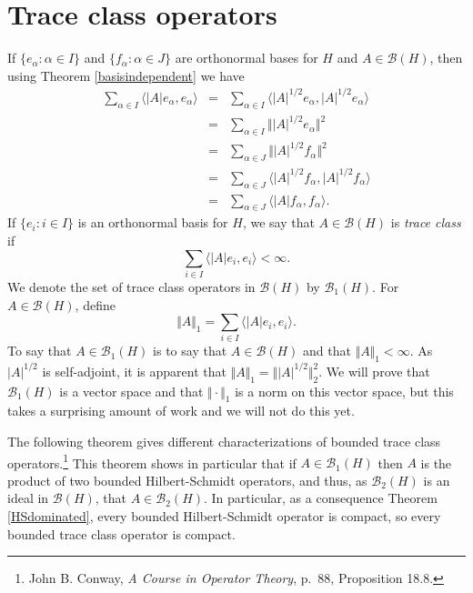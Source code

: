 \documentclass{article}
\newcommand{\inner}[2]{\langle #1, #2 \rangle}
\newcommand{\norm}[1]{\Vert #1 \Vert}
\begin{document}
\section{Trace class operators}
 If $\{e_\alpha: \alpha \in I\}$ and $\{f_\alpha: \alpha \in J\}$ are orthonormal bases for $H$
and $A \in \mathscr{B}(H)$, then using Theorem \ref{basisindependent} we have
\begin{eqnarray*}
\sum_{\alpha \in I} \inner{|A|e_\alpha}{e_\alpha}&=&\sum_{\alpha \in I} \inner{|A|^{1/2}e_\alpha}{|A|^{1/2}e_\alpha}\\
&=&\sum_{\alpha \in I} \norm{|A|^{1/2} e_\alpha}^2\\
&=&\sum_{\alpha \in J} \norm{|A|^{1/2} f_\alpha}^2\\
&=&\sum_{\alpha \in J} \inner{|A|^{1/2} f_\alpha}{|A|^{1/2} f_\alpha}\\
&=&\sum_{\alpha \in J} \inner{|A|f_\alpha}{f_\alpha}.
\end{eqnarray*}
If $\{e_i: i \in I\}$ is an orthonormal basis for $H$, we say that $A \in \mathscr{B}(H)$ is {\em trace class} if
\[
\sum_{i \in I} \inner{|A|e_i}{e_i} < \infty.
\]
We denote the set of trace class operators in $\mathscr{B}(H)$ by $\mathscr{B}_1(H)$. For $A \in \mathscr{B}(H)$, define
\[
\norm{A}_1 =\sum_{i \in I} \inner{|A|e_i}{e_i}.
\]
To say that $A \in \mathscr{B}_1(H)$ is to say that $A \in \mathscr{B}(H)$ and that $\norm{A}_1 < \infty$. 
As $|A|^{1/2}$ is self-adjoint,
it is apparent that $\norm{A}_1 = \norm{|A|^{1/2}}_2^2$.
We
will prove that $\mathscr{B}_1(H)$ is a vector space and that $\norm{\cdot}_1$ is a norm on this vector space, but this takes a surprising amount of work and we will not do this yet.




The following theorem gives different characterizations of bounded trace class operators.\footnote{John B. Conway,
{\em A Course in Operator Theory}, p.~88, Proposition 18.8.} This theorem shows in particular that if $A \in \mathscr{B}_1(H)$ then
$A$ is the product of two bounded Hilbert-Schmidt operators, and thus, as $\mathscr{B}_2(H)$ is an ideal in $\mathscr{B}(H)$,  that $A \in \mathscr{B}_2(H)$.
In particular, as a consequence Theorem \ref{HSdominated}, every bounded Hilbert-Schmidt operator is compact, so every bounded trace
class operator is compact.
\end{document}

